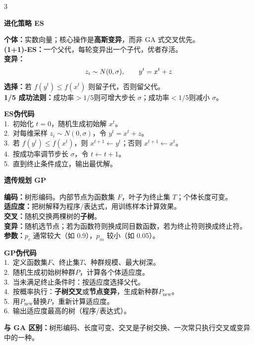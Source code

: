 \documentclass[8pt,a4paper]{ctexart}
\newcommand{\blk}[1]{%
  \par\needspace{2.2\baselineskip}%
  \vspace{1pt}\noindent
  \colorbox{black!10}{\parbox{\dimexpr\columnwidth-2\fboxsep\relax}{\textbf{#1}}}\par
  \vspace{1pt}}
\newcommand{\tightmath}[1]{\[
\vspace{-5pt}#1\vspace{-5pt}
\]}
\newcommand{\codebox}[1]{\begin{tcolorbox}#1\end{tcolorbox}}
\begin{document}
\begin{multicols*}{3}
\blk{进化策略 ES}
\textbf{个体：}实数向量；核心操作是\textbf{高斯变异}，而非 GA 式交叉优先。\\
\textbf{(1+1)-ES：}一个父代，每轮变异出一个子代，优者存活。\\
\textbf{变异：}
\tightmath{z_i\sim N(0,\sigma),\qquad y^t=x^t+z}
\textbf{选择：}若 $f(y^t)\le f(x^t)$ 则留子代，否则留父代。\\
\textbf{1/5 成功法则：}成功率$>1/5$则可增大步长 $\sigma$；成功率$<1/5$则减小 $\sigma$。\\
\codebox{
\textbf{ES伪代码}\\
1.\ 初始化 $t=0$，随机生成初始解 $x^t$。\\
2.\ 对每维采样 $z_i\sim N(0,\sigma)$，令 $y^t=x^t+z$。\\
3.\ 若 $f(y^t)\le f(x^t)$，则 $x^{t+1}\leftarrow y^t$；否则 $x^{t+1}\leftarrow x^t$。\\
4.\ 按成功率调节步长 $\sigma$，令 $t\leftarrow t+1$。\\
5.\ 直到终止条件成立，输出最优解。
}

\blk{遗传规划 GP}
\textbf{编码：}树形编码。内部节点为函数集 $F$，叶子为终止集 $T$；个体长度可变。\\
\textbf{适应度：}把树解释为程序/表达式，用训练样本计算效果。\\
\textbf{交叉：}随机交换两棵树的\textbf{子树}。\\
\textbf{变异：}随机选节点；若为函数符则换成同目数函数，若为终止符则换成终止符。\\
\textbf{参数：}$p_c$ 通常较大（如 0.9），$p_m$ 较小（如 0.05）。\\
\codebox{
\textbf{GP伪代码}\\
1.\ 定义函数集$F$、终止集$T$、种群规模、最大树深。\\
2.\ 随机生成初始树种群$P$，计算各个体适应度。\\
3.\ 当未满足终止条件时：按适应度选择父代。\\
4.\ 按概率执行：\textbf{子树交叉}或\textbf{节点变异}，生成新种群$P_{\text{new}}$。\\
5.\ 用$P_{\text{new}}$替换$P$，重新计算适应度。\\
6.\ 输出适应度最高的树（程序/表达式）。
}
\textbf{与 GA 区别：}树形编码、长度可变、交叉是子树交换、一次常只执行交叉或变异中的一种。


\end{multicols*}
\end{document}
